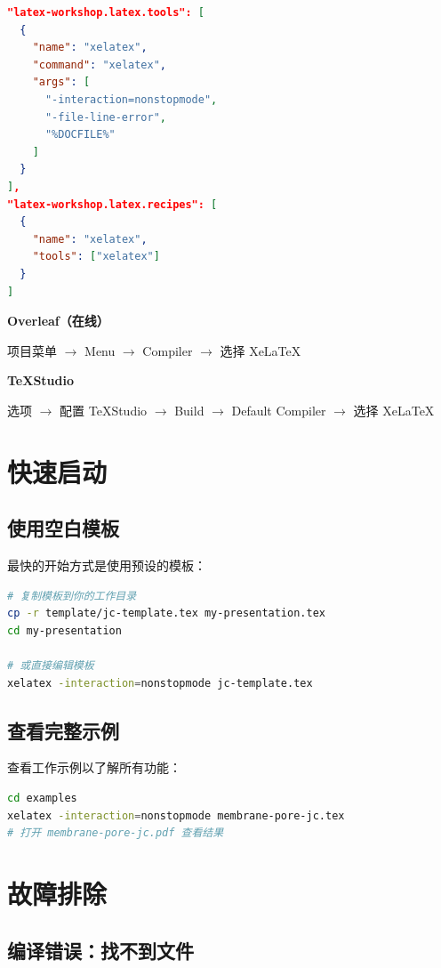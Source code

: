 \begin{lstlisting}[style=blockstyle,language=json]
"latex-workshop.latex.tools": [
  {
    "name": "xelatex",
    "command": "xelatex",
    "args": [
      "-interaction=nonstopmode",
      "-file-line-error",
      "%DOCFILE%"
    ]
  }
],
"latex-workshop.latex.recipes": [
  {
    "name": "xelatex",
    "tools": ["xelatex"]
  }
]
\end{lstlisting}

\textbf{Overleaf（在线）}

项目菜单 $\rightarrow$ Menu $\rightarrow$ Compiler $\rightarrow$ 选择 XeLaTeX

\textbf{TeXStudio}

选项 $\rightarrow$ 配置 TeXStudio $\rightarrow$ Build $\rightarrow$ Default Compiler $\rightarrow$ 选择 XeLaTeX

\section{快速启动}

\subsection{使用空白模板}

最快的开始方式是使用预设的模板：

\begin{lstlisting}[style=blockstyle,language=bash]
# 复制模板到你的工作目录
cp -r template/jc-template.tex my-presentation.tex
cd my-presentation

# 或直接编辑模板
xelatex -interaction=nonstopmode jc-template.tex
\end{lstlisting}

\subsection{查看完整示例}

查看工作示例以了解所有功能：

\begin{lstlisting}[style=blockstyle,language=bash]
cd examples
xelatex -interaction=nonstopmode membrane-pore-jc.tex
# 打开 membrane-pore-jc.pdf 查看结果
\end{lstlisting}

\section{故障排除}

\subsection{编译错误：找不到文件}

